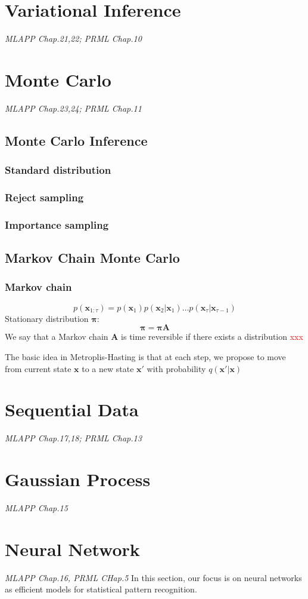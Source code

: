 \documentclass{article}
\newcommand{\ppi}{\bm{\pi}}
\newcommand{\mbf}{\mathbf}
\newcommand{\xx}{\mbf x}
\newcommand{\subsub}{\subsubsection*}
\begin{document}
\section{Variational Inference}
\emph{MLAPP Chap.21,22; PRML Chap.10}

\section{Monte Carlo}
\emph{MLAPP Chap.23,24; PRML Chap.11}
\subsection{Monte Carlo Inference}
\subsubsection*{Standard distribution}
\subsub{Reject sampling}
\subsub{Importance sampling}
\subsection{Markov Chain Monte Carlo}
\subsub{Markov chain}
\begin{equation}
    p(\xx_{1:\tau}) = p(\xx_1)p(\xx_2|\xx_1)\dots p(\xx_\tau|\xx_{\tau-1})
\end{equation}
Stationary distribution $\bm{\pi}$:
\begin{equation}
    \ppi = \ppi\mbf A
\end{equation}
We say that a Markov chain $\mbf A$ is time reversible if there exists a distribution 
\textcolor{red}{xxx}

The basic idea in Metroplis-Hasting is that at each step, we propose to move from current state $\xx$ to a new state $\xx'$ with probability $q(\xx'|\xx)$ 


\section{Sequential Data}
\emph{MLAPP Chap.17,18; PRML Chap.13}

\section{Gaussian Process}
\emph{MLAPP Chap.15}

\section{Neural Network}
\emph{MLAPP Chap.16, PRML CHap.5}
In this section, our focus is on neural networks as efficient models for statistical pattern recognition.
\end{document}
